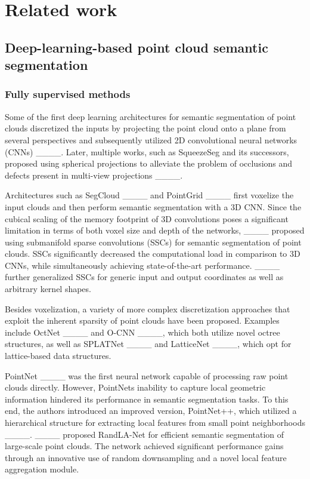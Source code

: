 \section{Related work}
\label{section:related_work}

\subsection{Deep-learning-based point cloud semantic segmentation}

\subsubsection{Fully supervised methods}

Some of the first deep learning architectures for semantic segmentation of point clouds discretized the inputs by projecting the point cloud onto a plane from several perspectives and subsequently utilized 2D convolutional neural networks (CNNs) ____. Later, multiple works, such as SqueezeSeg and its successors, proposed using spherical projections to alleviate the problem of occlusions and defects present in multi-view projections ____.

Architectures such as SegCloud ____ and PointGrid ____ first voxelize the input clouds and then perform semantic segmentation with a 3D CNN. Since the cubical scaling of the memory footprint of 3D convolutions poses a significant limitation in terms of both voxel size and depth of the networks, ____ proposed using submanifold sparse convolutions (SSCs) for semantic segmentation of point clouds. SSCs significantly decreased the computational load in comparison to 3D CNNs, while simultaneously achieving state-of-the-art performance. ____ further generalized SSCs for generic input and output coordinates as well as arbitrary kernel shapes.

Besides voxelization, a variety of more complex discretization approaches that exploit the inherent sparsity of point clouds have been proposed. Examples include OctNet ____ and O-CNN ____, which both utilize novel octree structures, as well as SPLATNet ____ and LatticeNet ____, which opt for lattice-based data structures.

PointNet ____ was the first neural network capable of processing raw point clouds directly. However, PointNets inability to capture local geometric information hindered its performance in semantic segmentation tasks. To this end, the authors introduced an improved version, PointNet++, which utilized a hierarchical structure for extracting local features from small point neighborhoods  ____. ____ proposed RandLA-Net for efficient semantic segmentation of large-scale point clouds. The network achieved significant performance gains through an innovative use of random downsampling and a novel local feature aggregation module.

